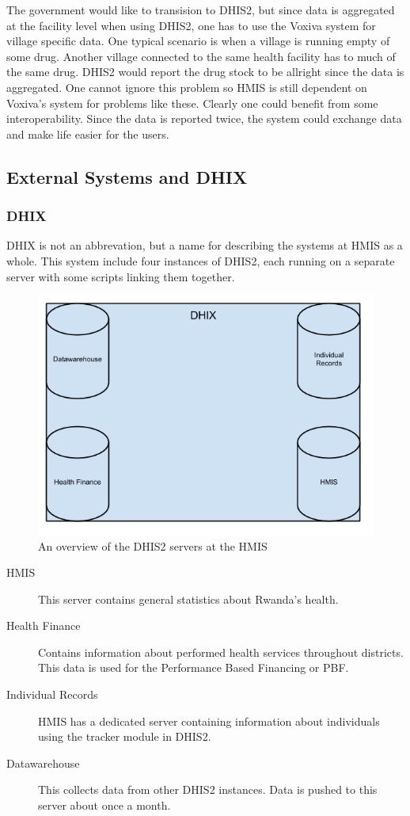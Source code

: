 The government would like to transision to DHIS2, but since data is aggregated at the facility level when using DHIS2, one has to use the Voxiva system for village specific data.
One typical scenario is when a village is running empty of some drug. Another village connected to the same health facility has to much of the same drug. DHIS2 would report the drug stock to be allright since the data is aggregated.
One cannot ignore this problem so HMIS is still dependent on Voxiva's system for problems like these.  
Clearly one could benefit from some interoperability. Since the data is reported twice, the system could exchange data and make life easier for the users. 


\subsection{External Systems and DHIX}
\subsubsection{DHIX}
DHIX is not an abbrevation, but a name for describing the systems at HMIS as a whole. This system include four instances of DHIS2, each running on a separate server with some scripts linking them together.
\begin{figure}
\centering
\includegraphics[width=12cm]{empirical/images/dhix_overview}
\caption{An overview of the DHIS2 servers at the HMIS}
\label{fig:dhix_overview}
\end{figure}

\begin{description}
\item[HMIS]This server contains general statistics about Rwanda's health.
\item[Health Finance]Contains information about performed health services throughout districts. This data is used for the Performance Based Financing or PBF. 
\item[Individual Records]HMIS has a dedicated server containing information about individuals using the tracker module in DHIS2.
\item[Datawarehouse]This collects data from other DHIS2 instances. Data is pushed to this server about once a month.
\end{description}

